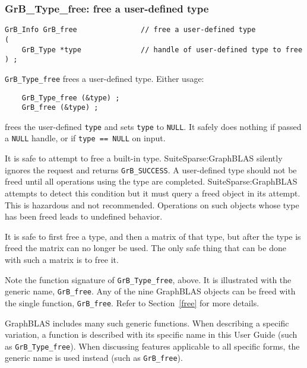 \documentclass[12pt]{article}
\begin{document}
\subsubsection{{\sf GrB\_Type\_free:} free a user-defined type}
\label{type_free}

\begin{mdframed}[userdefinedwidth=6in]
{\footnotesize
\begin{verbatim}
GrB_Info GrB_free               // free a user-defined type
(
    GrB_Type *type              // handle of user-defined type to free
) ;
\end{verbatim}
}\end{mdframed}

\verb'GrB_Type_free' frees a user-defined type.
Either usage:

    {\small
    \begin{verbatim}
    GrB_Type_free (&type) ;
    GrB_free (&type) ; \end{verbatim}}

\noindent
frees the user-defined \verb'type' and
sets \verb'type' to \verb'NULL'.
It safely does nothing if passed a \verb'NULL'
handle, or if \verb'type == NULL' on input.

It is safe to attempt to free a built-in type.  SuiteSparse:GraphBLAS silently
ignores the request and returns \verb'GrB_SUCCESS'.  A user-defined type should
not be freed until all operations using the type are completed.
SuiteSparse:GraphBLAS attempts to detect this condition but it must query a
freed object in its attempt.  This is hazardous and not recommended.
Operations on such objects whose type has been freed leads to undefined
behavior.

It is safe to first free a type, and then a matrix of that type, but after the
type is freed the matrix can no longer be used.  The only safe thing that can
be done with such a matrix is to free it.

Note the function signature of \verb'GrB_Type_free', above.  It is illustrated
with the generic name, \verb'GrB_free'.  Any of the nine GraphBLAS objects can
be freed with the single function, \verb'GrB_free'.  Refer to
Section~\ref{free} for more details.

GraphBLAS includes many such generic functions.  When describing a specific
variation, a function is described with its specific name in this User Guide
(such as \verb'GrB_Type_free').  When discussing features applicable to all
specific forms, the generic name is used instead (such as \verb'GrB_free').
\end{document}
